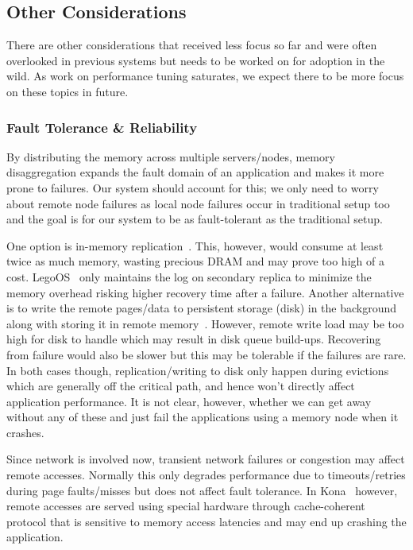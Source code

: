 
\subsection{Other Considerations}
There are other considerations that received less focus so far 
and were often overlooked in previous systems but needs to be 
worked on for adoption in the wild. As work on performance tuning 
saturates, we expect there to be more focus on these topics in future. 

\subsubsection{Fault Tolerance \& Reliability}
By distributing the memory across multiple servers/nodes, memory 
disaggregation expands the fault domain of an application 
and makes it more prone to failures. Our system should account
for this; we only need to worry about remote node 
failures as local node failures occur in traditional 
setup too and the goal is for our system to be as 
fault-tolerant as the traditional setup.

One option is in-memory replication~\cite{leap,kona}.
This, however, would consume at least twice as much memory,
wasting precious DRAM and may prove too high of a cost. 
LegoOS~\cite{legoos} only maintains the log on secondary 
replica to minimize the memory overhead risking higher 
recovery time after a failure. Another alternative 
is to write the remote pages/data to persistent storage (disk) 
in the background along with storing it in remote 
memory~\cite{infiniswap}. However, remote write load 
may be too high for disk to handle which may result in 
disk queue build-ups. Recovering from failure would also be 
slower but this may be tolerable if the failures are rare.
In both cases though, replication/writing to disk only happen 
during evictions which are generally off the critical path,
and hence won't directly affect application performance.
It is not clear, however, whether we can get away without 
any of these and just fail the applications using a memory
node when it crashes.

Since network is involved now, transient network failures
or congestion may affect remote accesses. Normally this only degrades 
performance due to timeouts/retries during page faults/misses
but does not affect fault tolerance. In Kona~\cite{kona} however,
remote accesses are served using special hardware through 
cache-coherent protocol that is sensitive to memory access 
latencies and may end up crashing the application.

